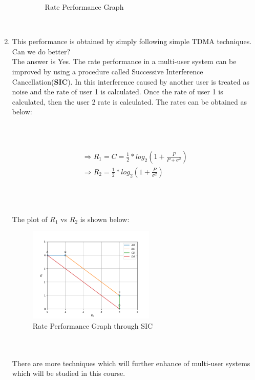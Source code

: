 \documentclass[a4paper]{article}
\begin{document}
\begin{enumerate}
\begin{enumerate}
\begin{figure}[!ht]
\caption{Rate Performance Graph}\label{fig:4}
\end{figure} \\
\end{enumerate}
\item This performance is obtained by simply following simple TDMA techniques. Can we do better?
\\
The answer is Yes. The rate performance in a multi-user system can be improved by using a procedure called Successive Interference Cancellation(\textbf{SIC}). In this interference caused by another user is treated as noise and the rate of user 1 is calculated. Once the rate of user 1 is calculated, then the user 2 rate is calculated. The rates can be obtained as below:\\
\\
\\
\\

\begin{align}
\begin{split}
	\Rightarrow R_1 = C = \frac{1}{2}*log_2(1+\frac{P}{P+\sigma^2})\\
	\Rightarrow R_2 = \frac{1}{2}*log_2(1+\frac{P}{\sigma^2})\\
\end{split}
\end{align}
\\
\\
\\

The plot of $R_1$ vs $R_2$ is shown below:
\begin{figure}[!ht]
\centering
\includegraphics[width=6.0cm]{R1_R2_better.png}
\caption{Rate Performance Graph through SIC}\label{fig:5}
\end{figure} \\
\\There are more techniques which will further enhance of multi-user systems which will be studied in this course.
\end{enumerate}
\bigskip
\end{document}
